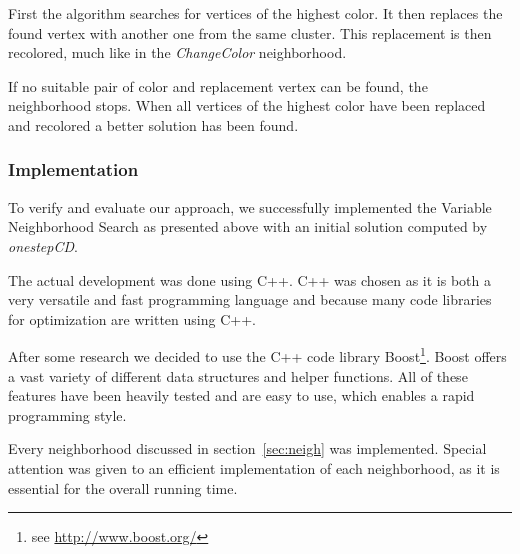 \documentclass[paper = a4, fontsize = 10pt]{scrartcl}
\begin{document}
First the algorithm searches for vertices of the highest color. It then replaces the found vertex with another one from the same cluster. This replacement is then recolored, much like in the \emph{ChangeColor} neighborhood.

If no suitable pair of color and replacement vertex can be found, the neighborhood stops. When all vertices of the highest color have been replaced and recolored a better solution has been found.

\subsubsection{Implementation}
To verify and evaluate our approach, we successfully implemented the Variable Neighborhood Search as presented above with an initial solution computed by \emph{onestepCD}.

The actual development was done using C++. C++ was chosen as it is both a very versatile and fast programming language and because many code libraries for optimization are written using C++.



After some research we decided to use the C++ code library Boost\footnote{see \url{http://www.boost.org/}}. Boost offers a vast variety of different data structures and helper functions. All of these features have been heavily tested and are easy to use, which enables a rapid programming style.


Every neighborhood discussed in section~\ref{sec:neigh} was implemented. Special attention was given to an efficient implementation of each neighborhood, as it is essential for the overall running time.
\end{document}
